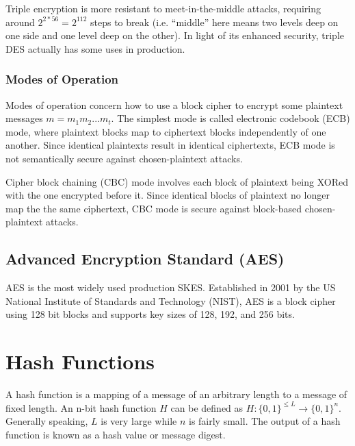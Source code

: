 \documentclass[12pt,titlepage]{article}
\let\stdsection\section
\renewcommand\section{\clearpage\stdsection}
\begin{document}
        Triple encryption is more resistant to meet-in-the-middle attacks, requiring around $2^{2*56} = 2^{112}$ steps to break (i.e. ``middle'' here means two levels
        deep on one side and one level deep on the other). In light of its enhanced security, triple DES actually has some uses in production.

      \subsubsection{Modes of Operation}
        Modes of operation concern how to use a block cipher to encrypt some plaintext messages $m = m_1 m_2 . . . m_t$. The simplest mode is called electronic codebook
        (ECB) mode, where plaintext blocks map to ciphertext blocks independently of one another. Since identical plaintexts result in identical ciphertexts, ECB mode
        is not semantically secure against chosen-plaintext attacks.

        Cipher block chaining (CBC) mode involves each block of plaintext being XORed with the one encrypted before it. Since identical blocks of plaintext no longer map
        the the same ciphertext, CBC mode is secure against block-based chosen-plaintext attacks.

    \subsection{Advanced Encryption Standard (AES)}
      AES is the most widely used production SKES. Established in 2001 by the US National Institute of Standards and Technology (NIST), AES is a block cipher using 128 bit
      blocks and supports key sizes of 128, 192, and 256 bits.

  \section{Hash Functions}
    A hash function is a mapping of a message of an arbitrary length to a message of fixed length. An n-bit hash function $H$ can be defined as
    $H : \{0, 1\}^{\leq L} \rightarrow \{0, 1\}^n$. Generally speaking, $L$ is very large while $n$ is fairly small. The output of a hash function is known as a hash value
    or message digest.
\end{document}
